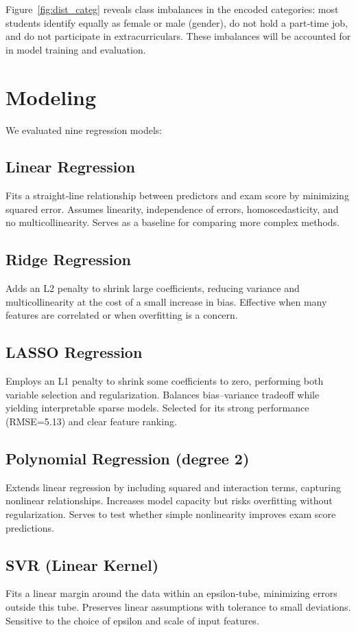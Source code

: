 \documentclass[conference]{IEEEtran}
\begin{document}
Figure~\ref{fig:dist_categ} reveals class imbalances in the encoded categories: most students identify equally as female or male (gender), do not hold a part‐time job, and do not participate in extracurriculars. These imbalances will be accounted for in model training and evaluation.


\section{Modeling}
We evaluated nine regression models:

\subsection{Linear Regression}
Fits a straight‐line relationship between predictors and exam score by minimizing squared error. Assumes linearity, independence of errors, homoscedasticity, and no multicollinearity. Serves as a baseline for comparing more complex methods.

\subsection{Ridge Regression}
Adds an L2 penalty to shrink large coefficients, reducing variance and multicollinearity at the cost of a small increase in bias. Effective when many features are correlated or when overfitting is a concern.

\subsection{LASSO Regression}
Employs an L1 penalty to shrink some coefficients to zero, performing both variable selection and regularization. Balances bias–variance tradeoff while yielding interpretable sparse models. Selected for its strong performance (RMSE=5.13) and clear feature ranking.

\subsection{Polynomial Regression (degree 2)}
Extends linear regression by including squared and interaction terms, capturing nonlinear relationships. Increases model capacity but risks overfitting without regularization. Serves to test whether simple nonlinearity improves exam score predictions.

\subsection{SVR (Linear Kernel)}
Fits a linear margin around the data within an epsilon‐tube, minimizing errors outside this tube. Preserves linear assumptions with tolerance to small deviations. Sensitive to the choice of epsilon and scale of input features.
\end{document}
